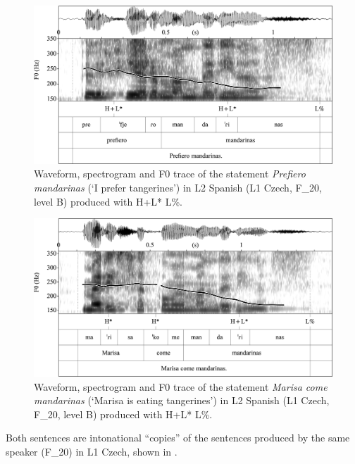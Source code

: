 \begin{figure}
\includegraphics[width=\textwidth]{figures/Figure_4.15.png}
\caption{Waveform, spectrogram and F0 trace of the statement \textit{Prefiero mandarinas} (‘I prefer tangerines’) in L2 Spanish (L1 Czech, \mbox{F\_20}, level B) produced with H+L* L\%.}
\label{fig:4.15}
\end{figure}

\begin{figure}
\includegraphics[width=\textwidth]{figures/Figure_4.16.png}
\caption{Waveform, spectrogram and F0 trace of the statement \textit{Marisa come mandarinas} (‘Marisa is eating tangerines’) in L2 Spanish (L1 Czech, \mbox{F\_20}, level B) produced with H+L* L\%.}
\label{fig:4.16}
\end{figure}

Both sentences are intonational “copies” of the sentences produced by the same speaker \mbox{(F\_20)} in L1 Czech, shown in .

